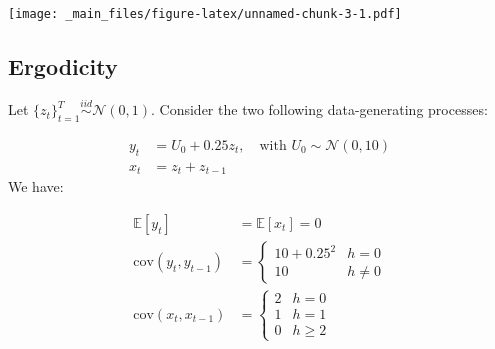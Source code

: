\documentclass[
]{book}
\begin{document}
\texttt{[image: \_main\_files/figure-latex/unnamed-chunk-3-1.pdf]}

\hypertarget{ergodicity}{%
\subsection*{Ergodicity}\label{ergodicity}}

Let \(\{z_t\}_{t = 1}^{T} \stackrel{iid}{\sim} \mathcal{N}(0, 1)\). Consider the two following data-generating processes:

\[
\begin{aligned}
y_t &= U_0 + 0.25z_t, \quad \text{with  } U_0 \sim \mathcal{N}(0, 10) \\[1ex]
x_t &= z_t + z_{t-1}
\end{aligned}
\]
We have:

\[
\begin{aligned}
\mathbb{E}[y_t] &= \mathbb{E}[x_t] = 0 \\[1em]
\text{cov}(y_t, y_{t-1}) &= 
\begin{cases}
10+0.25^2 & h = 0 \\
10 & h \neq 0
\end{cases} \\[1ex]
\text{cov}(x_t, x_{t-1}) &= 
\begin{cases}
2 & h = 0 \\
1 & h = 1 \\
0 & h \geq 2
\end{cases}
\end{aligned}
\]
\end{document}
